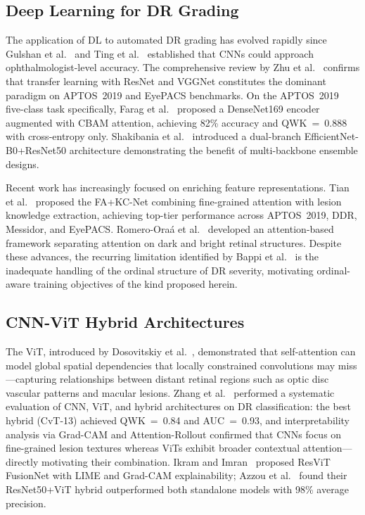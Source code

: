 \documentclass[10pt, twocolumn]{article}
\begin{document}
\subsection{Deep Learning for DR Grading}

The application of DL to automated DR grading has evolved rapidly since Gulshan et
al.~\cite{gulshan2016} and Ting et al.~\cite{ting2017} established that CNNs could
approach ophthalmologist-level accuracy. The comprehensive review by Zhu et
al.~\cite{zhu2024} confirms that transfer learning with ResNet and VGGNet
constitutes the dominant paradigm on APTOS~2019 and EyePACS benchmarks. On the
APTOS~2019 five-class task specifically, Farag et al.~\cite{farag2022} proposed a
DenseNet169 encoder augmented with CBAM attention, achieving 82\% accuracy and
QWK~=~0.888 with cross-entropy only. Shakibania et al.~\cite{shakibania2024}
introduced a dual-branch EfficientNet-B0+ResNet50 architecture demonstrating the
benefit of multi-backbone ensemble designs.

Recent work has increasingly focused on enriching feature representations. Tian et
al.~\cite{tian2023} proposed the FA+KC-Net combining fine-grained attention with
lesion knowledge extraction, achieving top-tier performance across APTOS~2019,
DDR, Messidor, and EyePACS. Romero-Ora\'a et al.~\cite{romero2024} developed an
attention-based framework separating attention on dark and bright retinal
structures. Despite these advances, the recurring limitation identified by Bappi et
al.~\cite{bappi2025} is the inadequate handling of the ordinal structure of DR
severity, motivating ordinal-aware training objectives of the kind proposed herein.

\subsection{CNN-ViT Hybrid Architectures}

The ViT, introduced by Dosovitskiy et al.~\cite{dosovitskiy2021}, demonstrated
that self-attention can model global spatial dependencies that locally constrained
convolutions may miss---capturing relationships between distant retinal regions such
as optic disc vascular patterns and macular lesions. Zhang et
al.~\cite{zhang2025} performed a systematic evaluation of CNN, ViT, and hybrid
architectures on DR classification: the best hybrid (CvT-13) achieved QWK~=~0.84
and AUC~=~0.93, and interpretability analysis via Grad-CAM and Attention-Rollout
confirmed that CNNs focus on fine-grained lesion textures whereas ViTs exhibit
broader contextual attention---directly motivating their combination. Ikram and
Imran~\cite{ikram2025} proposed ResViT FusionNet with LIME and Grad-CAM
explainability; Azzou et al.~\cite{azzou2025} found their ResNet50+ViT hybrid
outperformed both standalone models with 98\% average precision.
\end{document}
